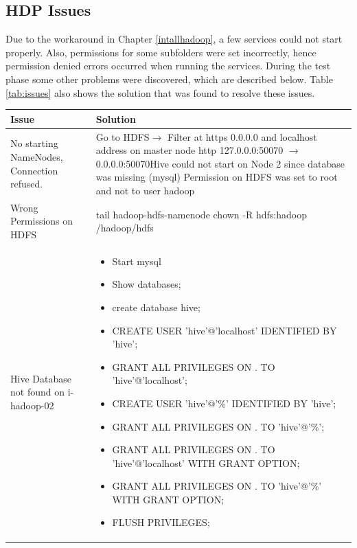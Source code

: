 \subsection{HDP Issues}
Due to the workaround in Chapter \ref{intallhadoop}, a few services could not start properly. Also, permissions for some subfolders were set incorrectly, hence permission denied errors occurred when running the services. During the test phase some other problems were discovered, which are described below. Table \ref{tab:issues} also shows the solution that was found to resolve these issues.
\begin{table}[H]
\hspace{-2.0cm}
\begin{tabular}{|p{4.4cm}|p{12.4cm}|}
	\hline
	\textbf{Issue} & \textbf{Solution} \\ \hline
	No starting NameNodes, Connection
refused. & Go to HDFS$\rightarrow$ Filter at https
0.0.0.0 and \newline localhost address on master node \newline http
127.0.0.0:50070 $\rightarrow$ 0.0.0.0:50070\newline Hive could not start on Node 2 since database was missing (mysql) Permission on HDFS was set to root and not to user hadoop
\\ \hline
Wrong Permissions on HDFS & tail hadoop-hdfs-namenode\newline
chown -R hdfs:hadoop /hadoop/hdfs \\ \hline
Hive Database not found on i-hadoop-02 & \begin{itemize}[noitemsep,leftmargin=*] 
\item Start mysql
\item Show databases;
\item create database hive;
\item CREATE USER 'hive'@'localhost' IDENTIFIED BY 'hive';
\item GRANT ALL PRIVILEGES ON . TO 'hive'@'localhost';
\item CREATE USER 'hive'@'\%' IDENTIFIED BY 'hive';
\item GRANT ALL PRIVILEGES ON . TO 'hive'@'\%';
\item GRANT ALL PRIVILEGES ON . TO 'hive'@'localhost' WITH GRANT OPTION;
\item GRANT ALL PRIVILEGES ON . TO 'hive'@'\%' WITH GRANT OPTION;
\item FLUSH PRIVILEGES;
\end{itemize}
\\ \hline

\end{tabular}
\end{table}
